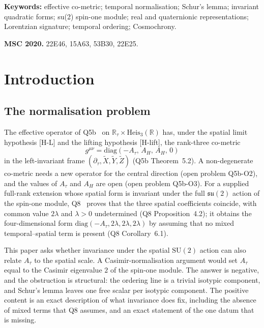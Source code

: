 \documentclass[12pt,a4paper]{article}
\newcommand{\su}{\mathfrak{su}}
\newcommand{\Heis}{\mathrm{Heis}}
\newcommand{\SU}{\mathrm{SU}}
\begin{document}
  \textbf{Keywords:} effective co-metric; temporal normalisation; Schur's lemma; invariant quadratic forms;
  su(2) spin-one module; real and quaternionic representations; Lorentzian signature; temporal ordering;
  Cosmochrony.

  \textbf{MSC 2020.} 22E46, 15A63, 53B30, 22E25.

  \clearpage
  \tableofcontents

  \newpage
  \section{Introduction}
    \label{sec:intro}

    \subsection{The normalisation problem}

      The effective operator of Q5b~\cite{Beau2026q5b} on $\mathbb{R}_\tau\times\Heis_3(\mathbb{R})$ has, under the
      spatial limit hypothesis [H-L] and the lifting hypothesis [H-lift], the rank-three co-metric
      \begin{equation}
        g^{\mu\nu} = \mathrm{diag}(-A_\tau,\, A_H,\, A_H,\, 0)
        \label{eq:metric-intro}
      \end{equation}
      in the left-invariant frame $(\partial_\tau, \tilde X, \tilde Y, \tilde Z)$ (Q5b Theorem~5.2).
      A non-degenerate co-metric needs a new operator for the central direction (open problem Q5b-O2), and the
      values of $A_\tau$ and $A_H$ are open (open problem Q5b-O3).
      For a supplied full-rank extension whose spatial form is invariant under the full $\su(2)$ action of the
      spin-one module, Q8~\cite{BeauQ8} proves that the three spatial coefficients coincide, with common value
      $2\lambda$ and $\lambda > 0$ undetermined (Q8 Proposition~4.2); it obtains the four-dimensional form
      $\mathrm{diag}(-A_\tau, 2\lambda, 2\lambda, 2\lambda)$ by assuming that no mixed temporal--spatial term is
      present (Q8 Corollary~6.1).

      This paper asks whether invariance under the spatial $\SU(2)$ action can also relate $A_\tau$ to the spatial
      scale.
      A Casimir-normalisation argument would set $A_\tau$ equal to the Casimir eigenvalue $2$ of the spin-one module.
      The answer is negative, and the obstruction is structural: the ordering line is a trivial isotypic component,
      and Schur's lemma leaves one free scalar per isotypic component.
      The positive content is an exact description of what invariance does fix, including the absence of mixed
      terms that Q8 assumes, and an exact statement of the one datum that is missing.
\end{document}
